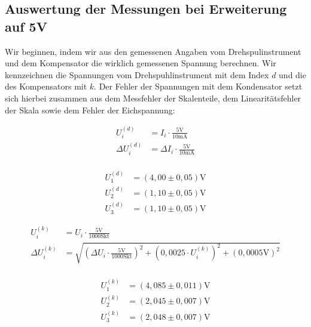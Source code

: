 \documentclass{article}
\begin{document}
\subsection{Auswertung der Messungen bei Erweiterung auf 5V}

Wir beginnen, indem wir aus den gemessenen Angaben vom Drehspulinstrument und dem Kompensator die wirklich gemessenen Spannung berechnen. Wir kennzeichnen die Spannungen vom Drehspuhlinstrument mit dem Index $d$ und die des Kompensators mit $k$. Der Fehler der Spannungen mit dem Kondensator setzt sich hierbei zusammen aus dem Messfehler der Skalenteile, dem Linearitätsfehler der Skala sowie dem Fehler der Eichspannung:

\begin{equation}
    \begin{split}
        U_i^{(d)} &= I_i \cdot \frac{5\text{V}}{10\text{mA}} \\ 
        \Delta U_i^{(d)} &= \Delta I_i \cdot \frac{5\text{V}}{10\text{mA}} \\
    \end{split}
\end{equation}

\begin{equation}
    \begin{split}
        U_1^{(d)} &= (4,00 \pm 0,05) \text{V} \\
        U_2^{(d)} &= (1,10 \pm 0,05) \text{V} \\
        U_3^{(d)} &= (1,10 \pm 0,05) \text{V} 
    \end{split}
\end{equation}

\begin{equation}
    \begin{split}
        U_i^{(k)} &= U_i \cdot \frac{5\text{V}}{1000\text{Skt}} \\ 
        \Delta U_i^{(k)} &= \sqrt{\left( \Delta U_i \cdot \frac{5\text{V}}{1000\text{Skt}} \right)^2 + \left( 0,0025 \cdot U_i^{(k)} \right)^2 + \left( 0,0005 \text{V} \right)^2}  \\
    \end{split}
\end{equation}

\begin{equation}
    \begin{split}
        U_1^{(k)} &= (4,085 \pm 0,011) \text{V} \\
        U_2^{(k)} &= (2,045 \pm 0,007) \text{V} \\
        U_3^{(k)} &= (2,048 \pm 0,007) \text{V}         
    \end{split}
\end{equation}
\end{document}
